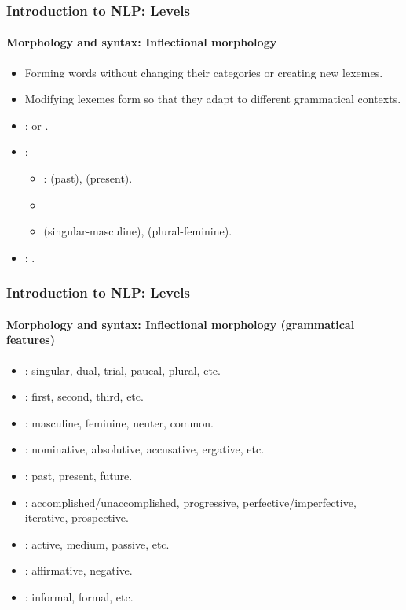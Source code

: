 \documentclass[xcolor=table]{beamer}
\begin{document}
\begin{frame}
\frametitle{Introduction to NLP: Levels}
\framesubtitle{Morphology and syntax: Inflectional morphology}

\begin{itemize}
	\item Forming words without changing their categories or creating new lexemes.
	\item Modifying lexemes form so that they adapt to different grammatical contexts.
	\item {}:  or .
	\item {}:
	\begin{itemize}
		\item {}:  (past),  (present).
		\item {}
		\item {}  (singular-masculine),  (plural-feminine).
	\end{itemize}
	\item {}: .
	
\end{itemize}
\end{frame}

\begin{frame}
\frametitle{Introduction to NLP: Levels}
\framesubtitle{Morphology and syntax: Inflectional morphology (grammatical features)}

\begin{itemize}
	\item {}: singular, dual, trial, paucal, plural, etc. 
	\item {}: first, second, third, etc.
	\item {}: masculine, feminine, neuter, common.
	\item {}: nominative, absolutive, accusative, ergative, etc.
	\item {}: past, present, future.
	\item {}: accomplished/unaccomplished, progressive, perfective/imperfective, iterative, prospective.
	\item {}: active, medium, passive, etc.
	\item {}: affirmative, negative.
	\item {}: informal, formal, etc.
\end{itemize}

\end{frame}
\end{document}
